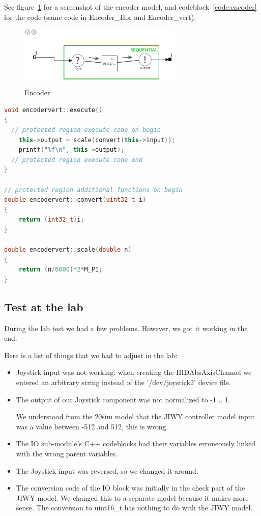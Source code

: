 \documentclass[a4paper,twoside,11pt]{article}
\begin{document}
See figure~\ref{fig:jiwy-encoder} for a screenshot of the encoder model, and 
codeblock~\ref{code:encoder} for the code (same code in Encoder\_Hor and Encoder\_vert).
\begin{figure}[h]
	\centering
	\includegraphics[width=0.7\textwidth]{./img/jiwy-encoder.png}
	\caption{Encoder}
	\label{fig:jiwy-encoder}
\end{figure}
\begin{lstlisting}[caption=Relevant code of the Encoder\_vert and Encoder\_hor models, label=code:encoder, language=C++]
void encodervert::execute()
{
  // protected region execute code on begin
	this->output = scale(convert(this->input));
	printf("%f\n", this->output);
  // protected region execute code end
}

// protected region additional functions on begin
double encodervert::convert(uint32_t i)
{
	return (int32_t)i;
}

double encodervert::scale(double n)
{
	return (n/6000)*2*M_PI;
}
\end{lstlisting}
\subsection{Test at the lab}
During the lab test we had a few problems. However, we got it working in the end.

Here is a list of things that we had to adjust in the lab:
\begin{itemize}
	\item Joystick input was not working: when creating the HIDAbsAxisChannel we entered an arbitrary string instead of the '/dev/joystick2' device file.
	\item The output of our Joystick component was not normalized to -1 .. 1.

		We understood from the 20sim model that the JIWY controller model input was a value between -512 and 512, this is wrong.
	\item The IO sub-module's C++ codeblocks had their variables erroneously linked with the wrong parent variables.
	\item The Joystick input was reversed, so we changed it around.
	\item The conversion code of the IO block was initially in the check part of the JIWY model.
		We changed this to a separate model because it makes more sense.
		The conversion to uint16\_t has nothing to do with the JIWY model.
\end{itemize}
\end{document}
